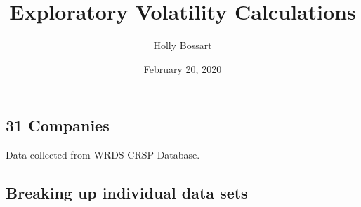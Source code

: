 \documentclass[]{article}
\title{Exploratory Volatility Calculations}
\author{Holly Bossart}
\date{February 20, 2020}
\newenvironment{Shaded}{\begin{snugshade}}{\end{snugshade}}
\newcommand{\KeywordTok}[1]{\textcolor[rgb]{0.13,0.29,0.53}{\textbf{#1}}}
\newcommand{\StringTok}[1]{\textcolor[rgb]{0.31,0.60,0.02}{#1}}
\newcommand{\OperatorTok}[1]{\textcolor[rgb]{0.81,0.36,0.00}{\textbf{#1}}}
\newcommand{\NormalTok}[1]{#1}
\begin{document}
\maketitle

\subsection{31 Companies}\label{companies}

Data collected from WRDS CRSP Database.

\begin{Shaded}
\end{Shaded}

\subsection{Breaking up individual data
sets}\label{breaking-up-individual-data-sets}
\end{document}
